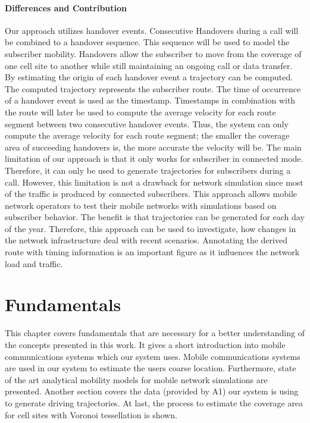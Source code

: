 \documentclass[master,english]{hgbthesis}
\begin{document}
\subsubsection{Differences and Contribution}
Our approach utilizes handover events. Consecutive Handovers during a call will be combined to a handover sequence. This sequence will be used to model the subscriber mobility. Handovers allow the subscriber to move from the coverage of one cell site to another while still maintaining an ongoing call or data transfer. By estimating the origin of each handover event a trajectory can be computed. The computed trajectory represents the subscriber route. The time of occurrence of a handover event is used as the timestamp. Timestamps in combination with the route will later be used to compute the average velocity for each route segment between two consecutive handover events. Thus, the system can only compute the average velocity for each route segment; the smaller the coverage area of succeeding handovers is, the more accurate the velocity will be. The main limitation of our approach is that it only works for subscriber in connected mode. Therefore, it can only be used to generate trajectories for subscribers during a call. However, this limitation is not a drawback for network simulation since most of the traffic is produced by connected subscribers.
This approach allows mobile network operators to test their mobile networks with simulations based on subscriber behavior. The benefit is that trajectories can be generated for each day of the year. Therefore, this approach can be used to investigate, how changes in the network infrastructure deal with recent scenarios. Annotating the derived route with timing information is an important figure as it influences the network load and traffic. 
\chapter{Fundamentals}
\label{cha:fundamentals}
This chapter covers fundamentals that are necessary for a better understanding of the concepts presented in this work. It gives a short introduction into mobile communications systems which our system uses. Mobile communications systems are used in our system to estimate the users coarse location. Furthermore, state of the art analytical mobility models for mobile network simulations are presented. Another section covers the data (provided by A1) our system is using to generate driving trajectories. At last, the process to estimate the coverage area for cell sites with Voronoi tessellation is shown.
\end{document}
